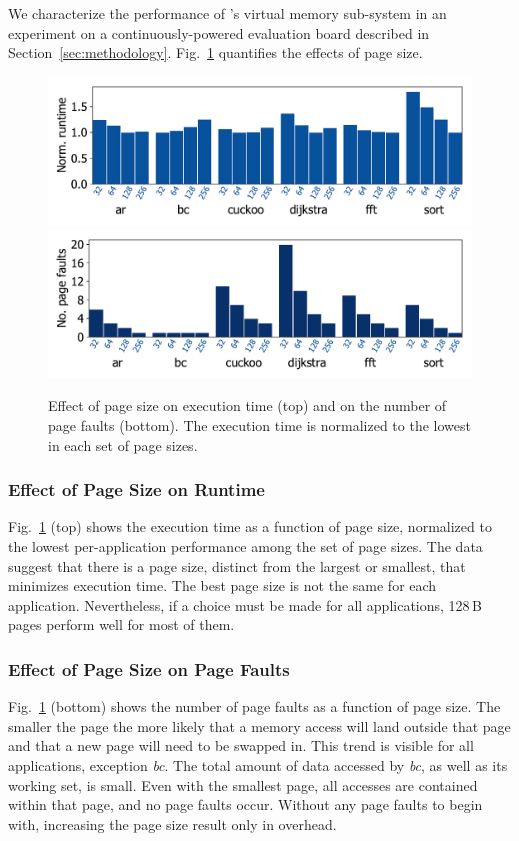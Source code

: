 We characterize the performance of \sys's virtual memory sub-system in an
experiment on a continuously-powered evaluation board described in
Section~\ref{sec:methodology}.  Fig.~\ref{fig:page_size} quantifies the
effects of page size.
%
\begin{figure}
	\centering
	\includegraphics[width=\columnwidth]{figures/page_exec-time}
	\includegraphics[width=\columnwidth]{figures/pagePulls}
    \caption{Effect of page size on execution time (top) and on the number of
page faults (bottom). The execution time is normalized to the lowest in each set
of page sizes.}
	\label{fig:page_size}
\end{figure}
%
\subsubsection{Effect of Page Size on Runtime}
%
Fig.~\ref{fig:page_size} (top) shows the execution time as a function
of page size, normalized to the lowest per-application performance among the
set of page sizes.
The data suggest that there is a page size, distinct from the largest or
smallest, that minimizes execution time. The best page size is not the same for
each application. Nevertheless, if a choice must be made for all applications,
128\,B pages perform well for most of them.
%
\subsubsection{Effect of Page Size on Page Faults}
%
Fig.~\ref{fig:page_size} (bottom) shows the number of page faults as a
function of page size.
%
The smaller the page the more likely that a memory access will land
outside that page and that a new page will need to be swapped in.
%
This trend is visible for all applications, exception \textit{bc}. The total
amount of data accessed by \textit{bc}, as well as its working set, is small.
Even with the smallest page, all accesses are contained within that page, and
no page faults occur. Without any page faults to begin with, increasing the
page size result only in overhead.